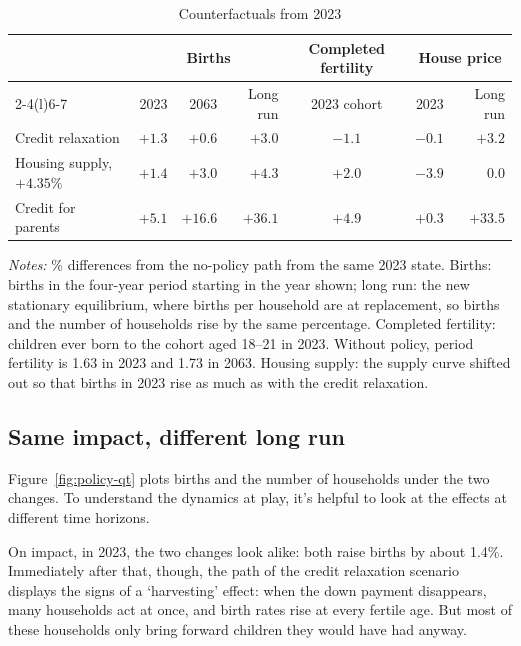\begin{table}[H]
\centering
\caption{Counterfactuals from 2023}
\label{tab:policy-main}
\small
\begin{tabularx}{\textwidth}{@{}Xrrrcrr@{}}
\toprule
 & \multicolumn{3}{c}{Births} & Completed fertility & \multicolumn{2}{c}{House price} \\
\cmidrule(lr){2-4}\cmidrule(l){6-7}
 & 2023 & 2063 & Long run & 2023 cohort & 2023 & Long run \\
\midrule
Credit relaxation & $+1.3$ & $+0.6$ & $+3.0$ & $-1.1$ & $-0.1$ & $+3.2$ \\
Housing supply, $+4.35\%$ & $+1.4$ & $+3.0$ & $+4.3$ & $+2.0$ & $-3.9$ & $0.0$ \\
Credit for parents & $+5.1$ & $+16.6$ & $+36.1$ & $+4.9$ & $+0.3$ & $+33.5$ \\
\bottomrule
\end{tabularx}
\par\smallskip
\begin{minipage}{0.95\linewidth}
\footnotesize\textit{Notes:} \% differences from the no-policy path from the
same 2023 state. Births: births in the
four-year period starting in the year shown; long run: the new stationary
equilibrium, where births per household are at replacement, so births and the
number of households rise by the same percentage. Completed fertility:
children ever born to the cohort aged 18--21 in 2023. Without policy, period
fertility is 1.63 in 2023 and 1.73 in 2063. Housing supply: the supply curve
shifted out so that births in 2023 rise as much as with the credit relaxation.
\end{minipage}
\end{table}

\subsection{Same impact, different long run}
\label{sec:policy-supply}

Figure~\ref{fig:policy-qt} plots births and the number of households under
the two changes. To understand the dynamics at play, it's helpful to look at the effects at different time horizons.

On impact, in 2023, the two changes look alike: both raise births by about
1.4\%. Immediately after that, though, the path of the credit relaxation scenario displays the signs of a `harvesting'
effect: when the down payment disappears, many households act at once, and
birth rates rise at every fertile age. But most of these households only bring
forward children they would have had anyway.

